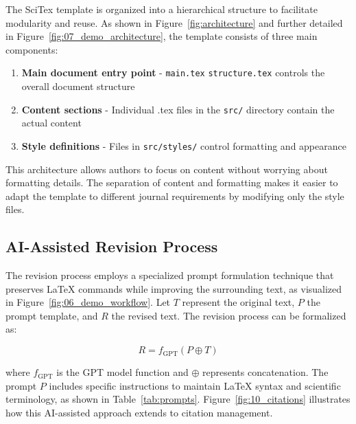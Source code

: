\documentclass[preprint,review,12pt]{elsarticle}%
\providecommand{\DIFaddbegin}{} %
\providecommand{\DIFaddend}{} %
\providecommand{\DIFdelbegin}{} %
\providecommand{\DIFdelend}{} %
\newcommand{\DIFscaledelfig}{0.5}
\newlength{\DIFdelgraphicswidth} %
\newlength{\DIFdelgraphicsheight} %
\newcommand{\DIFaddincludegraphics}[2][]{{\color{blue}\fbox{\DIFOincludegraphics[#1]{#2}}}} %
\newcommand{\DIFdelincludegraphics}[2][]{%
\sbox{\DIFdelgraphicsbox}{\DIFOincludegraphics[#1]{#2}}%
\settoboxwidth{\DIFdelgraphicswidth}{\DIFdelgraphicsbox} %
\settoboxtotalheight{\DIFdelgraphicsheight}{\DIFdelgraphicsbox} %
\scalebox{\DIFscaledelfig}{%
\parbox[b]{\DIFdelgraphicswidth}{\usebox{\DIFdelgraphicsbox}\\[-\baselineskip] \rule{\DIFdelgraphicswidth}{0em}}\llap{\resizebox{\DIFdelgraphicswidth}{\DIFdelgraphicsheight}{%
\setlength{\unitlength}{\DIFdelgraphicswidth}%
\begin{picture}(1,1)%
\thicklines\linethickness{2pt} %
{\color[rgb]{1,0,0}\put(0,0){\framebox(1,1){}}}%
{\color[rgb]{1,0,0}\put(0,0){\line( 1,1){1}}}%
{\color[rgb]{1,0,0}\put(0,1){\line(1,-1){1}}}%
\end{picture}%
}\hspace*{3pt}}} %
} %
\DeclareRobustCommand{\DIFaddbegin}{\DIFOaddbegin \let\includegraphics\DIFaddincludegraphics} %
\DeclareRobustCommand{\DIFaddend}{\DIFOaddend \let\includegraphics\DIFOincludegraphics} %
\DeclareRobustCommand{\DIFdelbegin}{\DIFOdelbegin \let\includegraphics\DIFdelincludegraphics} %
\DeclareRobustCommand{\DIFdelend}{\DIFOaddend \let\includegraphics\DIFOincludegraphics} %
\begin{document}
\begin{frontmatter}
The SciTex template is organized into a hierarchical structure to facilitate modularity and reuse. As shown in Figure~\ref{fig:architecture} and further detailed in Figure~\ref{fig:07_demo_architecture}, the template consists of three main components:

\begin{enumerate}
    \item \textbf{Main document entry point} - \DIFdelbegin %
{\color{red}%
\verb|main.tex| %
}%
\DIFdelend \DIFaddbegin {\color{blue}%
\verb|structure.tex| %
}%
\DIFaddend controls the overall document structure
    \item \textbf{Content sections} - Individual .tex files in the \verb|src/| directory contain the actual content
    \item \textbf{Style definitions} - Files in \verb|src/styles/| control formatting and appearance
\end{enumerate}

This architecture allows authors to focus on content without worrying about formatting details. The separation of content and formatting makes it easier to adapt the template to different journal requirements by modifying only the style files.


\subsection{AI-Assisted Revision Process}
\label{subsec:ai-revision}

The revision process employs a specialized prompt formulation technique that preserves LaTeX commands while improving the surrounding text, as visualized in Figure~\ref{fig:06_demo_workflow}. Let $T$ represent the original text, $P$ the prompt template, and $R$ the revised text. The revision process can be formalized as:

\begin{equation}
R = f_{\text{GPT}}(P \oplus T)
\end{equation}

where $f_{\text{GPT}}$ is the GPT model function and $\oplus$ represents concatenation. The prompt $P$ includes specific instructions to maintain LaTeX syntax and scientific terminology, as shown in Table~\ref{tab:prompts}. Figure~\ref{fig:10_citations} illustrates how this AI-assisted approach extends to citation management.


\end{frontmatter}
\end{document}
